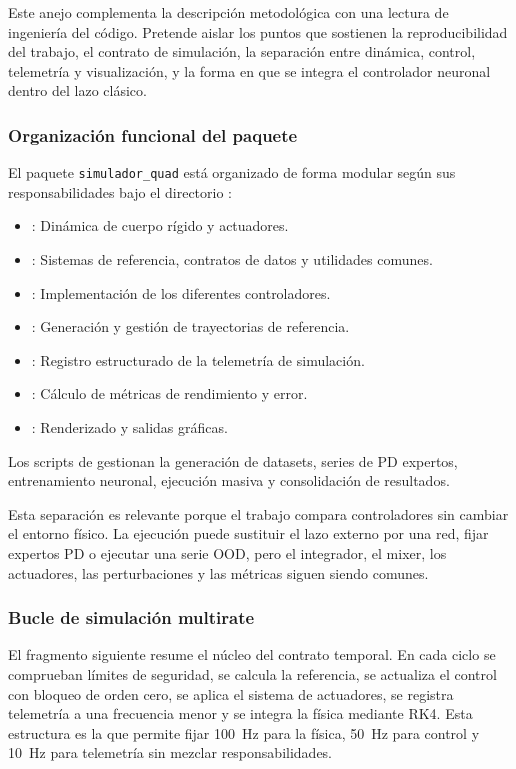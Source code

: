 Este anejo complementa la descripción metodológica con una lectura de
ingeniería del código. Pretende aislar los puntos que sostienen la
reproducibilidad del trabajo, el contrato de simulación,
la separación entre dinámica, control, telemetría y visualización, y la forma en
que se integra el controlador neuronal dentro del lazo clásico.

\subsubsection*{Organización funcional del paquete}

El paquete \texttt{simulador\_quad} está organizado de forma modular según sus
responsabilidades bajo el directorio :
\begin{itemize}
    \item {}: Dinámica de cuerpo rígido y actuadores.
    \item {}: Sistemas de referencia, contratos de datos y utilidades comunes.
    \item {}: Implementación de los diferentes controladores.
    \item {}: Generación y gestión de trayectorias de referencia.
    \item {}: Registro estructurado de la telemetría de simulación.
    \item {}: Cálculo de métricas de rendimiento y error.
    \item {}: Renderizado y salidas gráficas.
\end{itemize}
Los scripts de  gestionan la generación de datasets, series de PD
expertos, entrenamiento neuronal, ejecución masiva y consolidación de
resultados.

Esta separación es relevante porque el trabajo compara controladores sin
cambiar el entorno físico. La ejecución puede sustituir el lazo externo por una
red, fijar expertos PD o ejecutar una serie OOD, pero el integrador, el
mixer, los actuadores, las perturbaciones y las métricas siguen siendo comunes.

\subsubsection*{Bucle de simulación multirate}

El fragmento siguiente resume el núcleo del contrato temporal. En cada ciclo se
comprueban límites de seguridad, se calcula la referencia, se actualiza el
control con bloqueo de orden cero, se aplica el sistema de actuadores, se
registra telemetría a una frecuencia menor y se integra la física mediante
RK4. Esta estructura es la que permite fijar \SI{100}{Hz} para la física,
\SI{50}{Hz} para control y \SI{10}{Hz} para telemetría sin mezclar
responsabilidades.

